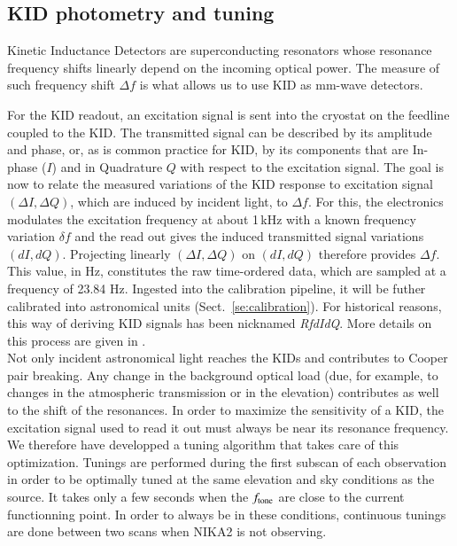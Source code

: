 

\subsection{KID photometry and tuning}
\label{se:tuning}

Kinetic Inductance Detectors are superconducting resonators whose resonance
frequency shifts linearly depend on the incoming optical power. The
measure of such frequency shift $\Delta f$ is what allows us to use
KID as mm-wave detectors.

For the KID readout, an excitation signal is sent into the cryostat on the
feedline coupled to the KID. The transmitted signal can be described by its
amplitude and phase, or, as is common practice for KID, by its components that
are In-phase ($I$) and in Quadrature $Q$ with respect to the excitation
signal. The goal is now to relate the measured variations of the KID response
to excitation signal $(\Delta I, \Delta Q)$, which are induced by incident light, to
$\Delta f$. For this, the electronics modulates the excitation
frequency at about 1\,kHz with a known frequency variation $\delta f$
and the read out gives the induced transmitted signal variations
$(dI, dQ)$. Projecting linearly
$(\Delta I, \Delta Q)$ on $(dI, dQ)$ therefore
provides $\Delta f$. This value, in Hz, constitutes the raw
time-ordered data, which are sampled at a frequency of 23.84
Hz. Ingested into the calibration pipeline, it will be futher calibrated into astronomical units
(Sect.~\ref{se:calibration}). For historical reasons, this way of deriving KID
signals has been nicknamed \emph{RfdIdQ}. More details on this process are given
in \cite{Calvo13}.\\

Not only incident astronomical light reaches the KIDs and contributes to Cooper
pair breaking. Any change in the background optical load (due, for example, to changes in
the atmospheric transmission or in the elevation) contributes as well to the
shift of the resonances. In order to maximize the sensitivity of a KID, the
excitation signal used to read it out must always be near its resonance
frequency. We therefore have developped a tuning algorithm that takes care of
this optimization. Tunings are performed during the first subscan of each
observation in order to be optimally tuned at the same elevation and sky
conditions as the source. It takes only a few seconds when the $f_{\rm{tone}}$ are
close to the current functionning point. In order to always be in these
conditions, continuous tunings are done between two scans when NIKA2 is not observing.


